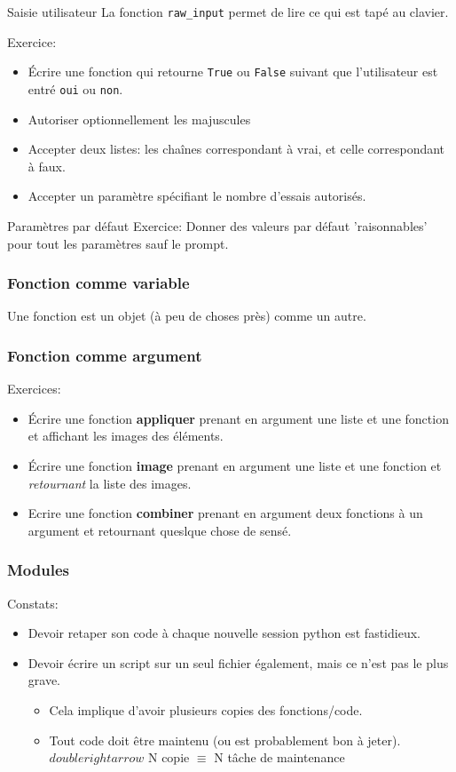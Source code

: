\documentclass{beamer}
\begin{document}
\begin{frame}{Saisie utilisateur}
  La fonction {\tt raw\_input} permet de lire ce qui est tapé au clavier.

  Exercice:
  \begin{itemize}
  \item Écrire une fonction qui retourne {\tt True} ou {\tt False} suivant que l'utilisateur est entré {\tt oui} ou {\tt non}.
  \item Autoriser optionnellement les majuscules
  \item Accepter deux listes: les chaînes correspondant à vrai, et celle correspondant à faux.
  \item Accepter un paramètre spécifiant le nombre d'essais autorisés.
  \end{itemize}
\end{frame}

\begin{frame}{Paramètres par défaut}
  Exercice: Donner des valeurs par défaut 'raisonnables' pour tout les paramètres sauf le prompt.
\end{frame}

\begin{frame}[fragile]\frametitle{Fonction comme variable}
  Une fonction est un objet (à peu de choses près) comme un autre.
  \fbox{}
\end{frame}

\begin{frame}[fragile]\frametitle{Fonction comme argument}
  Exercices:
  \begin{itemize}
  \item Écrire une fonction {\bf appliquer} prenant en argument une liste et une fonction et affichant les images des éléments.
  \item Écrire une fonction {\bf image} prenant en argument une liste et une fonction et {\em retournant} la liste des images.
  \item Ecrire une fonction {\bf combiner} prenant en argument deux fonctions à un argument et retournant queslque chose de sensé.
  \end{itemize}
\end{frame}

\begin{frame}[fragile]\frametitle{Modules}
  Constats:
  \begin{itemize}
  \item Devoir retaper son code à chaque nouvelle session python est fastidieux.
  \item Devoir écrire un script sur un seul fichier également, mais ce n'est pas le plus grave.
    \begin{itemize}
    \item Cela implique d'avoir plusieurs copies des fonctions/code.
    \item Tout code doit être maintenu (ou est probablement bon à jeter). \linebreak
      $doublerightarrow$ N copie $\equiv$ N tâche de maintenance
    \end{itemize}
  \end{itemize}
\end{frame}
\end{document}
